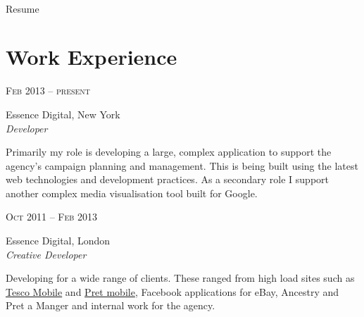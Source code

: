 \documentclass[10pt]{article}
\begin{document}
\color{text1} %


\par{\\
{\color{headings} Resume\\[15pt]\par}


\begin{minipage}[t]{0.5\textwidth}
\vspace{0pt}


\section{Work Experience} 

{\raggedleft\textsc{Feb 2013 -- present}\par}

{\raggedright\large Essence Digital, New York\\
\textit{Developer}\\[5pt]}

\normalsize{Primarily my role is developing a large, complex application to support the agency's campaign planning and management. This is being built using the latest web technologies and development practices. As a secondary role I support another complex media visualisation tool built for Google.}\\

{\raggedleft\textsc{Oct 2011 -- Feb 2013}\par}

{\raggedright\large Essence Digital, London\\
\textit{Creative Developer}\\[5pt]}

\normalsize{Developing for a wide range of clients. These ranged from high load sites such as \href{http://shop.tescomobile.com}{Tesco Mobile} and \href{http://m.pret.com}{Pret mobile}, Facebook applications for eBay, Ancestry and Pret a Manger and internal work for the agency.
}\\


\end{minipage}}
\end{document}
